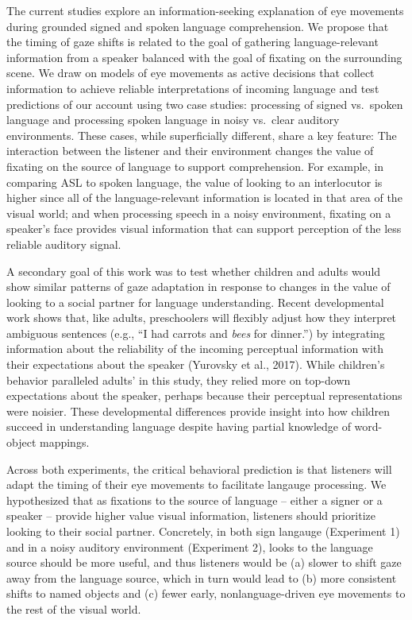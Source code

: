 \documentclass[,man,floatsintext]{apa6}
\begin{document}
The current studies explore an information-seeking explanation of eye
movements during grounded signed and spoken language comprehension. We
propose that the timing of gaze shifts is related to the goal of
gathering language-relevant information from a speaker balanced with the
goal of fixating on the surrounding scene. We draw on models of eye
movements as active decisions that collect information to achieve
reliable interpretations of incoming language and test predictions of
our account using two case studies: processing of signed vs.~spoken
language and processing spoken language in noisy vs.~clear auditory
environments. These cases, while superficially different, share a key
feature: The interaction between the listener and their environment
changes the value of fixating on the source of language to support
comprehension. For example, in comparing ASL to spoken language, the
value of looking to an interlocutor is higher since all of the
language-relevant information is located in that area of the visual
world; and when processing speech in a noisy environment, fixating on a
speaker's face provides visual information that can support perception
of the less reliable auditory signal.

A secondary goal of this work was to test whether children and adults
would show similar patterns of gaze adaptation in response to changes in
the value of looking to a social partner for language understanding.
Recent developmental work shows that, like adults, preschoolers will
flexibly adjust how they interpret ambiguous sentences (e.g., \enquote{I
had carrots and \emph{bees} for dinner.}) by integrating information
about the reliability of the incoming perceptual information with their
expectations about the speaker (Yurovsky et al., 2017). While children's
behavior paralleled adults' in this study, they relied more on top-down
expectations about the speaker, perhaps because their perceptual
representations were noisier. These developmental differences provide
insight into how children succeed in understanding language despite
having partial knowledge of word-object mappings.

Across both experiments, the critical behavioral prediction is that
listeners will adapt the timing of their eye movements to facilitate
langauge processing. We hypothesized that as fixations to the source of
language -- either a signer or a speaker -- provide higher value visual
information, listeners should prioritize looking to their social
partner. Concretely, in both sign langauge (Experiment 1) and in a noisy
auditory environment (Experiment 2), looks to the language source should
be more useful, and thus listeners would be (a) slower to shift gaze
away from the language source, which in turn would lead to (b) more
consistent shifts to named objects and (c) fewer early,
nonlanguage-driven eye movements to the rest of the visual world.
\end{document}

